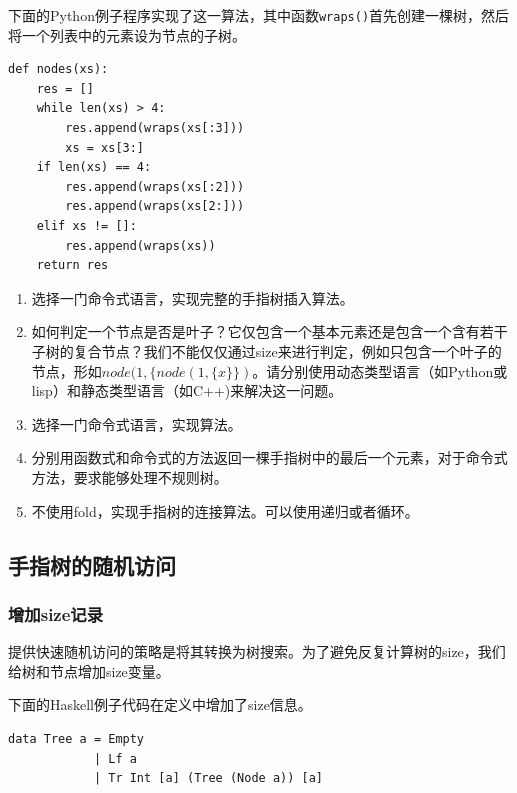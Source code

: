 \documentclass[b5paper]{ctexart}
\begin{document}
下面的Python例子程序实现了这一算法，其中函数\texttt{wraps()}首先创建一棵树，然后将一个列表中的元素设为节点的子树。

\begin{lstlisting}
def nodes(xs):
    res = []
    while len(xs) > 4:
        res.append(wraps(xs[:3]))
        xs = xs[3:]
    if len(xs) == 4:
        res.append(wraps(xs[:2]))
        res.append(wraps(xs[2:]))
    elif xs != []:
        res.append(wraps(xs))
    return res
\end{lstlisting}

\begin{Exercise}
\begin{enumerate}
\item 选择一门命令式语言，实现完整的手指树插入算法。

\item 如何判定一个节点是否是叶子？它仅包含一个基本元素还是包含一个含有若干子树的复合节点？我们不能仅仅通过size来进行判定，例如只包含一个叶子的节点，形如$node(1, \{node(1, \{x\}\})$。请分别使用动态类型语言（如Python或lisp）和静态类型语言（如C++)来解决这一问题。

\item 选择一门命令式语言，实现算法。

\item 分别用函数式和命令式的方法返回一棵手指树中的最后一个元素，对于命令式方法，要求能够处理不规则树。

\item 不使用fold，实现手指树的连接算法。可以使用递归或者循环。
\end{enumerate}
\end{Exercise}

\subsection{手指树的随机访问}

\subsubsection{增加size记录}
提供快速随机访问的策略是将其转换为树搜索。为了避免反复计算树的size，我们给树和节点增加size变量。

下面的Haskell例子代码在定义中增加了size信息。

\lstset{language=Haskell}
\begin{lstlisting}[style=Haskell]
data Tree a = Empty
            | Lf a
            | Tr Int [a] (Tree (Node a)) [a]
\end{lstlisting}
\end{document}
